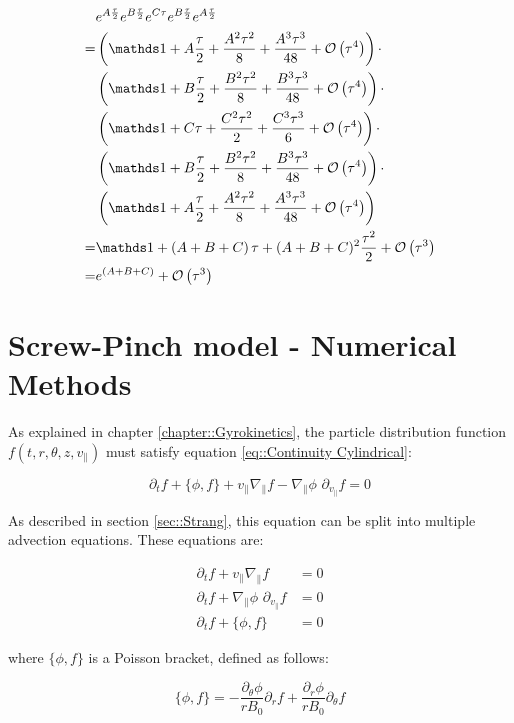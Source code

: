\begin{align*}
 &e^{A\frac{\tau}{2}}e^{B\frac{\tau}{2}}e^{C\tau}e^{B\frac{\tau}{2}}e^{A\frac{\tau}{2}}\\
 =& \left(\Id + A\frac{\tau}{2} + \frac{A^2\tau^2}{8} + \frac{A^3\tau^3}{48} + \O{\tau^4}\right)\cdot\\
 & \left(\Id + B\frac{\tau}{2} + \frac{B^2\tau^2}{8} + \frac{B^3\tau^3}{48} + \O{\tau^4}\right)\cdot\\
 & \left(\Id + C\tau + \frac{C^2\tau^2}{2} + \frac{C^3\tau^3}{6} + \O{\tau^4}\right)\cdot\\
 & \left(\Id + B\frac{\tau}{2} + \frac{B^2\tau^2}{8} + \frac{B^3\tau^3}{48} + \O{\tau^4}\right)\cdot\\
 & \left(\Id + A\frac{\tau}{2} + \frac{A^2\tau^2}{8} + \frac{A^3\tau^3}{48} + \O{\tau^4}\right)\\
 =& \Id + \left(A+B+C\right)\tau + (A+B+C)^2\frac{\tau^2}{2} + \O{\tau^3}\\
 =& e^{(A+B+C)} + \O{\tau^3}
\end{align*}

\section{Screw-Pinch model - Numerical Methods}

As explained in chapter \ref{chapter::Gyrokinetics}, the particle distribution function $f(t,r,\theta,z,v_\parallel)$ must satisfy equation \ref{eq::Continuity Cylindrical}:

\begin{equation*}
 \partial_t f + \{\phi, f \} + v_\parallel \nabla_\parallel f - \nabla_\parallel \phi\,\, \partial_{v_\parallel} f = 0
\end{equation*}

As described in section \ref{sec::Strang}, this equation can be split into multiple advection equations. These equations are:

\begin{align}
 \partial_t f + v_\parallel \nabla_\parallel f &= 0 \label{Eq::Advection1}\\
 \partial_t f + \nabla_\parallel \phi\,\, \partial_{v_{\parallel}} f &= 0 \label{Eq::Advection2}\\
 \partial_t f + \{\phi, f\} &= 0 \label{Eq::Advection3}
\end{align}

where $\{\phi,f\}$ is a Poisson bracket, defined as follows:

\begin{equation}
 \{\phi,f\}=-\frac{\partial_\theta\phi}{rB_0}\partial_r f + \frac{\partial_r\phi}{rB_0}\partial_\theta f
\end{equation}

